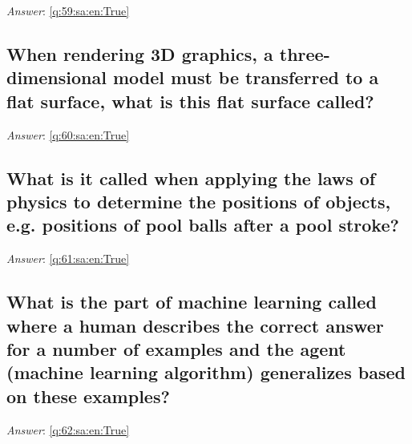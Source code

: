 \documentclass[a4paper,11pt,oneside]{article}
\begin{document}
\begin{sloppypar}
\textit{Answer}: \autoref{q:59:sa:en:True}



\subsection{When rendering 3D graphics, a three-dimensional model must be transferred to a flat surface, what is this flat surface called?}

\label{q:60:sa:en:False}

\vspace{2cm}

\noindent\makebox[\textwidth]{\hrulefill}

\vspace{1cm}

\textit{Answer}: \autoref{q:60:sa:en:True}



\subsection{What is it called when applying the laws of physics to determine the positions of objects, e.g. positions of pool balls after a pool stroke?}

\label{q:61:sa:en:False}

\vspace{2cm}

\noindent\makebox[\textwidth]{\hrulefill}

\vspace{1cm}

\textit{Answer}: \autoref{q:61:sa:en:True}



\subsection{What is the part of machine learning called where a human describes the correct answer for a number of examples and the agent (machine learning algorithm) generalizes based on these examples?}

\label{q:62:sa:en:False}

\vspace{2cm}

\noindent\makebox[\textwidth]{\hrulefill}

\vspace{1cm}

\textit{Answer}: \autoref{q:62:sa:en:True}




\end{sloppypar}
\end{document}
